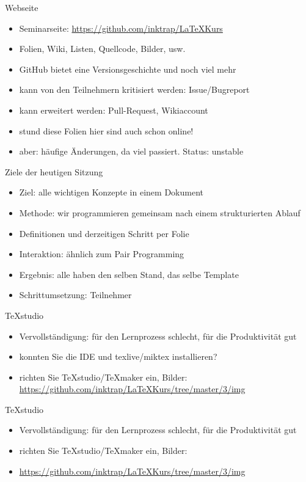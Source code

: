 \begin{frame}{Webseite}
\begin{itemize}[<+->]
    \item Seminarseite: \href{https://github.com/inktrap/LaTeXKurs}{https://github.com/inktrap/LaTeXKurs}
    \item Folien, Wiki, Listen, Quellcode, Bilder, usw.
    \item GitHub bietet eine Versionsgeschichte und noch viel mehr
    \item kann von den Teilnehmern kritisiert werden: Issue/Bugreport
    \item kann erweitert werden: Pull-Request, Wikiaccount
    \item st{und diese Folien hier sind auch schon online!}
    \item aber: häufige Änderungen, da viel passiert. Status: unstable
\end{itemize}
\end{frame}

\begin{frame}{Ziele der heutigen Sitzung}
    \begin{itemize}[<+->]
    \item Ziel: alle wichtigen Konzepte in einem Dokument
    \item Methode: wir programmieren gemeinsam nach einem strukturierten Ablauf
    \item Definitionen und derzeitigen Schritt per Folie
    \item Interaktion: ähnlich zum Pair Programming
    \item Ergebnis: alle haben den selben Stand, das selbe Template
    \item Schrittumsetzung: Teilnehmer
    \end{itemize}
\end{frame}

\begin{frame}{TeXstudio}
    \begin{itemize}
        \item Vervollständigung: für den Lernprozess schlecht, für die Produktivität gut
        \item konnten Sie die IDE und texlive/miktex installieren?
        \item richten Sie TeXstudio/TeXmaker ein, Bilder: \href{https://github.com/inktrap/LaTeXKurs/tree/master/3/img}{https://github.com/inktrap/LaTeXKurs/tree/master/3/img}
    \end{itemize}
\end{frame}

\begin{frame}{TeXstudio}
    \begin{itemize}
        \item Vervollständigung: für den Lernprozess schlecht, für die Produktivität gut
        \item richten Sie TeXstudio/TeXmaker ein, Bilder:
        \item \href{https://github.com/inktrap/LaTeXKurs/tree/master/3/img}{https://github.com/inktrap/LaTeXKurs/tree/master/3/img}
    \end{itemize}
\end{frame}